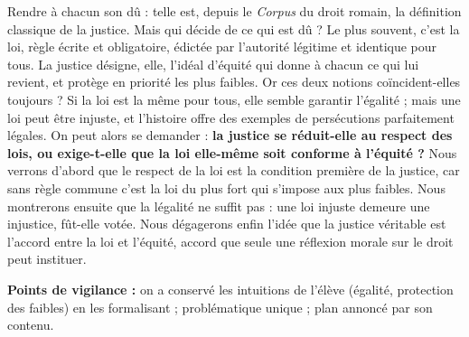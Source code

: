 \documentclass[11pt]{article}
\newcommand{\cle}[1]{{\popxbold\color{popdark}#1}}
\begin{document}
\begin{corrige}
\medskip
\og Rendre à chacun son dû \fg{} : telle est, depuis le \emph{Corpus} du droit romain, la définition classique de la justice. Mais qui décide de ce qui est \og dû \fg{} ? Le plus souvent, c'est la loi, règle écrite et obligatoire, édictée par l'autorité légitime et identique pour tous. La \cle{justice} désigne, elle, l'idéal d'équité qui donne à chacun ce qui lui revient, et protège en priorité les plus faibles. Or ces deux notions coïncident-elles toujours ? Si la loi est la même pour tous, elle semble garantir l'égalité ; mais une loi peut être injuste, et l'histoire offre des exemples de persécutions parfaitement légales. On peut alors se demander : \textbf{la justice se réduit-elle au respect des lois, ou exige-t-elle que la loi elle-même soit conforme à l'équité ?} Nous verrons d'abord que le respect de la loi est la condition première de la justice, car sans règle commune c'est la loi du plus fort qui s'impose aux plus faibles. Nous montrerons ensuite que la légalité ne suffit pas : une loi injuste demeure une injustice, fût-elle votée. Nous dégagerons enfin l'idée que la justice véritable est l'accord entre la loi et l'équité, accord que seule une réflexion morale sur le droit peut instituer.

\medskip
\textbf{Points de vigilance :} on a conservé les intuitions de l'élève (égalité, protection des faibles) en les formalisant ; problématique unique ; plan annoncé par son contenu.
\end{corrige}
\end{document}
